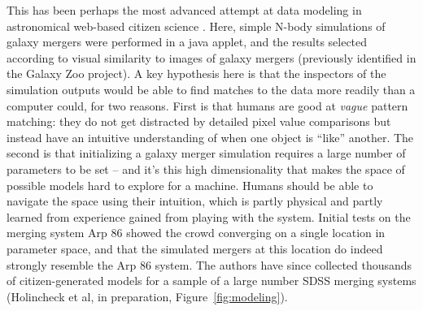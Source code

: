 \documentclass{ar2e}
\def\Fref#1{Figure~\ref{#1}\xspace}
\def\CaseStudy#1{\noindent{\it\bf #1 \,\,\,\,}}
\begin{document}


\CaseStudy{Galaxy Zoo: Mergers} 
This has been perhaps the most advanced attempt at data modeling in 
astronomical web-based citizen science \citep{HolincheckEtal2010,WallinEtal2010}.
Here, simple N-body simulations of galaxy mergers were performed in a java
applet, and the results selected according to visual similarity to images of
galaxy mergers (previously identified in the Galaxy Zoo project). A key
hypothesis here is that the inspectors of the simulation outputs would be able
to find matches to the data more readily than a computer could, for two reasons.
First is that humans are good at {\it vague} pattern matching: they do not get
distracted by detailed pixel value comparisons but instead have an intuitive
understanding of when one object is ``like'' another. The second is that
initializing a galaxy merger simulation requires a large number of parameters to
be set -- and it's this high dimensionality  that makes the space of possible
models hard to explore for a machine. Humans should be able to navigate the
space using their intuition, which is partly physical and partly learned from
experience gained from playing with the system. Initial tests on the merging
system Arp 86 showed
the crowd converging on a single location in parameter space, and that the
simulated mergers at this location do indeed strongly resemble the Arp 86
system. The authors have since collected thousands of citizen-generated models
for a sample of a large number SDSS merging systems (Holincheck et al, in
preparation, \Fref{fig:modeling}). 
\end{document}
